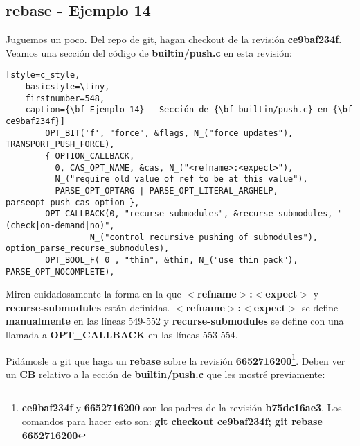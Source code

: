\subsection{rebase - Ejemplo 14}
\label{rebase}
\label{example_14}

Juguemos un poco. Del \hyperref[git_repo]{repo de git}, hagan checkout de la revisión {\bf ce9baf234f}. Veamos una sección
del código de {\bf builtin/push.c} en esta revisión:

\begin{lstlisting}[style=c_style,
	basicstyle=\tiny,
	firstnumber=548,
	caption={\bf Ejemplo 14} - Sección de {\bf builtin/push.c} en {\bf ce9baf234f}]
		OPT_BIT('f', "force", &flags, N_("force updates"), TRANSPORT_PUSH_FORCE),
		{ OPTION_CALLBACK,
		  0, CAS_OPT_NAME, &cas, N_("<refname>:<expect>"),
		  N_("require old value of ref to be at this value"),
		  PARSE_OPT_OPTARG | PARSE_OPT_LITERAL_ARGHELP, parseopt_push_cas_option },
		OPT_CALLBACK(0, "recurse-submodules", &recurse_submodules, "(check|on-demand|no)",
			     N_("control recursive pushing of submodules"), option_parse_recurse_submodules),
		OPT_BOOL_F( 0 , "thin", &thin, N_("use thin pack"), PARSE_OPT_NOCOMPLETE),
\end{lstlisting}

Miren cuidadosamente la forma en la que {\bf $<$refname$>$:$<$expect$>$} y {\bf recurse-submodules} están definidas.
{\bf $<$refname$>$:$<$expect$>$} se define {\bf manualmente} en las líneas 549-552 y {\bf recurse-submodules} se define
con una llamada a {\bf OPT\_CALLBACK} en las líneas 553-554.

Pidámosle a git que haga un {\bf rebase} sobre la revisión {\bf 6652716200}\footnote{{\bf ce9baf234f} y {\bf 6652716200}
son los padres de la revisión {\bf b75dc16ae3}. Los comandos para hacer esto son: {\bf git checkout ce9baf234f; git rebase 6652716200}}.
Deben ver un {\bf CB} relativo a la ección de {\bf builtin/push.c} que les mostré previamente:

